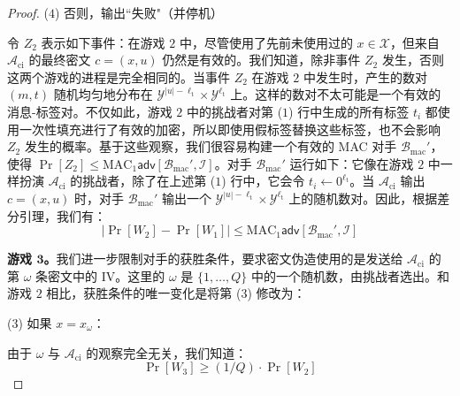 \begin{proof}
\vspace*{10pt}

\noindent
\hspace*{7pt} ($4$)
\hspace*{47.2pt} 否则，输出``失败"（并停机）

\vspace*{10pt}

\noindent
令 $Z_2$ 表示如下事件：在游戏 $2$ 中，尽管使用了先前未使用过的 $x\in\mathcal{X}$，但来自 $\mathcal{A}_\mathrm{ci}$ 的最终密文 $c=(x,u)$ 仍然是有效的。我们知道，除非事件 $Z_2$ 发生，否则这两个游戏的进程是完全相同的。当事件 $Z_2$ 在游戏 $2$ 中发生时，产生的数对 $(m,t)$ 随机均匀地分布在 $\mathcal{Y}^{|u|-\ell_\mathrm{t}}\times\mathcal{Y}^{\ell_\mathrm{t}}$ 上。这样的数对不太可能是一个有效的消息-标签对。不仅如此，游戏 $2$ 中的挑战者对第 ($1$) 行中生成的所有标签 $t_i$ 都使用一次性填充进行了有效的加密，所以即使用假标签替换这些标签，也不会影响 $Z_2$ 发生的概率。基于这些观察，我们很容易构建一个有效的 MAC 对手 $\mathcal{B}_\mathrm{mac}'$，使得 $\Pr[Z_2]\leq\mathrm{MAC}_1\mathsf{adv}[\mathcal{B}_\mathrm{mac}',\mathcal{I}]$。对手 $\mathcal{B}_\mathrm{mac}'$ 运行如下：它像在游戏 $2$ 中一样扮演 $\mathcal{A}_\mathrm{ci}$ 的挑战者，除了在上述第 ($1$) 行中，它会令 $t_i\leftarrow 0^{\ell_\mathrm{t}}$。当 $\mathcal{A}_\mathrm{ci}$ 输出 $c=(x,u)$ 时，对手 $\mathcal{B}_\mathrm{mac}'$ 输出一个 $\mathcal{Y}^{|u|-\ell_\mathrm{t}}\times\mathcal{Y}^{\ell_\mathrm{t}}$ 上的随机数对。因此，根据差分引理，我们有：
\begin{equation}\label{eq:9-14}
\big\lvert
\Pr[W_2]-\Pr[W_1]
\big\rvert
\leq
\mathrm{MAC}_1\mathsf{adv}[\mathcal{B}_\mathrm{mac}',\mathcal{I}]
\end{equation}

\noindent\textbf{游戏 $\mathbf{3}$。}我们进一步限制对手的获胜条件，要求密文伪造使用的是发送给 $\mathcal{A}_\mathrm{ci}$ 的第 $\omega$ 条密文中的 IV。这里的 $\omega$ 是 $\{1,\dots,Q\}$ 中的一个随机数，由挑战者选出。和游戏 $2$ 相比，获胜条件的唯一变化是将第 ($3$) 修改为：

\vspace*{10pt}

\noindent
\hspace*{7pt} ($3$)
\hspace*{22.5pt} 如果 $x=x_\omega$：\\

\vspace*{10pt}

\noindent
由于 $\omega$ 与 $\mathcal{A}_\mathrm{ci}$ 的观察完全无关，我们知道：
\begin{equation}\label{eq:9-15}
\Pr[W_3]\geq
(1/Q)\cdot\Pr[W_2]
\end{equation}



\end{proof}
